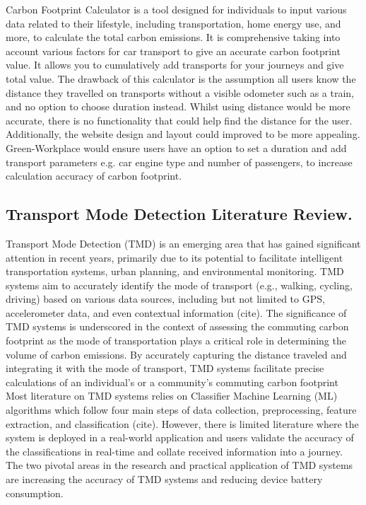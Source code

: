 \documentclass{l4proj}
\begin{document}
Carbon Footprint Calculator is a tool designed for individuals to input various data related to their lifestyle, including transportation, home energy use, and more, to calculate the total carbon emissions. It is comprehensive taking into account various factors for car transport to give an accurate carbon footprint value. It allows you to cumulatively add transports for your journeys and give total value. The drawback of this calculator is the assumption all users know the distance they travelled on transports without a visible odometer such as a train, and no option to choose duration instead. Whilst using distance would be more accurate, there is no functionality that could help find the distance for the user. Additionally, the website design and layout could improved to be more appealing. Green-Workplace would ensure users have an option to set a duration and add transport parameters e.g. car engine type and number of passengers, to increase calculation accuracy of carbon footprint.

\subsection{Transport Mode Detection Literature Review.}

Transport Mode Detection (TMD) is an emerging area that has gained significant attention in recent years, primarily due to its potential to facilitate intelligent transportation systems, urban planning, and environmental monitoring. TMD systems aim to accurately identify the mode of transport (e.g., walking, cycling, driving) based on various data sources, including but not limited to GPS, accelerometer data, and even contextual information (cite). The significance of TMD systems is underscored in the context of assessing the commuting carbon footprint as the mode of transportation plays a critical role in determining the volume of carbon emissions. By accurately capturing the distance traveled and integrating it with the mode of transport, TMD systems facilitate precise calculations of an individual's or a community's commuting carbon footprint
Most literature on TMD systems relies on Classifier Machine Learning (ML) algorithms which follow four main steps of data collection, preprocessing, feature extraction, and classification (cite). However, there is limited literature where the system is deployed in a real-world application and users validate the accuracy of the classifications in real-time and collate received information into a journey. The two pivotal areas in the research and practical application of TMD systems are increasing the accuracy of TMD systems and reducing device battery consumption.
\end{document}
